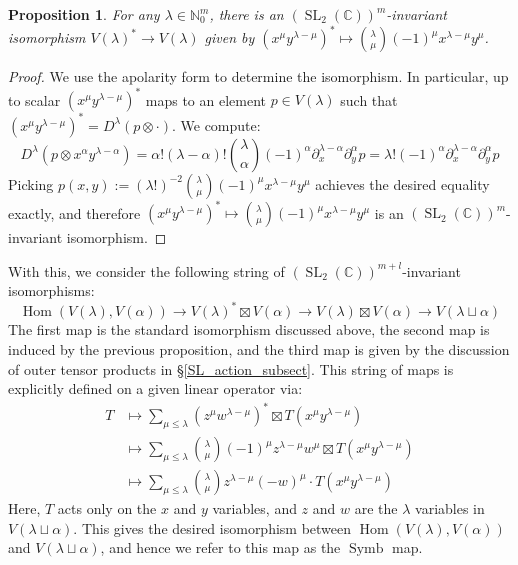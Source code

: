 \documentclass{article}
\newtheorem{proposition}[theorem]{Proposition}
\theoremstyle{definition}
\theoremstyle{plain}
\newcommand{\C}{\mathbb{C}}
\newcommand{\N}{\mathbb{N}}
\DeclareMathOperator{\Symb}{Symb}
\DeclareMathOperator{\Hom}{Hom}
\DeclareMathOperator{\SL}{SL}
\begin{document}
\begin{proposition}
    For any $\lambda \in \N_0^m$, there is an $(\SL_2(\C))^m$-invariant isomorphism $V(\lambda)^* \rightarrow V(\lambda)$ given by $(x^\mu y^{\lambda-\mu})^* \mapsto \binom{\lambda}{\mu}(-1)^{\mu} x^{\lambda-\mu} y^\mu$.
\end{proposition}
\begin{proof}
    We use the apolarity form to determine the isomorphism. In particular, up to scalar $(x^\mu y^{\lambda-\mu})^*$ maps to an element $p \in V(\lambda)$ such that $(x^\mu y^{\lambda-\mu})^* = D^\lambda(p \otimes \cdot)$. We compute:
    \[
        D^\lambda(p \otimes x^\alpha y^{\lambda-\alpha}) = \alpha!(\lambda-\alpha)! \binom{\lambda}{\alpha} (-1)^{\alpha} \partial_x^{\lambda-\alpha} \partial_y^\alpha p = \lambda! (-1)^{\alpha} \partial_x^{\lambda-\alpha} \partial_y^\alpha p
    \]
    Picking $p(x,y) := (\lambda!)^{-2}\binom{\lambda}{\mu}(-1)^{\mu} x^{\lambda-\mu} y^\mu$ achieves the desired equality exactly, and therefore $(x^\mu y^{\lambda-\mu})^* \mapsto \binom{\lambda}{\mu}(-1)^{\mu} x^{\lambda-\mu} y^\mu$ is an $(\SL_2(\C))^m$-invariant isomorphism.
\end{proof}

With this, we consider the following string of $(\SL_2(\C))^{m+l}$-invariant isomorphisms:
\[
    \Hom(V(\lambda),V(\alpha)) \rightarrow V(\lambda)^* \boxtimes V(\alpha) \rightarrow V(\lambda) \boxtimes V(\alpha) \rightarrow V(\lambda \sqcup \alpha)
\]
The first map is the standard isomorphism discussed above, the second map is induced by the previous proposition, and the third map is given by the discussion of outer tensor products in \S\ref{SL_action_subsect}. This string of maps is explicitly defined on a given linear operator via:
\[
    \begin{split}
        T &\mapsto \sum_{\mu \leq \lambda} (z^\mu w^{\lambda-\mu})^* \boxtimes T(x^\mu y^{\lambda-\mu}) \\
            &\mapsto \sum_{\mu \leq \lambda} \binom{\lambda}{\mu} (-1)^{\mu} z^{\lambda-\mu} w^{\mu} \boxtimes T(x^\mu y^{\lambda-\mu}) \\
            &\mapsto \sum_{\mu \leq \lambda} \binom{\lambda}{\mu} z^{\lambda-\mu} (-w)^{\mu} \cdot T(x^\mu y^{\lambda-\mu})
    \end{split}
\]
Here, $T$ acts only on the $x$ and $y$ variables, and $z$ and $w$ are the $\lambda$ variables in $V(\lambda \sqcup \alpha)$. This gives the desired isomorphism between $\Hom(V(\lambda),V(\alpha))$ and $V(\lambda \sqcup \alpha)$, and hence we refer to this map as the $\Symb$ map.
\end{document}
